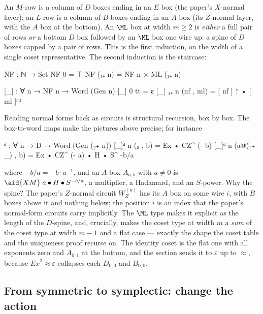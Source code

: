 \medskip\noindent
An $M$-row is a column of $D$ boxes ending in an $E$ box (the paper's
$X$-normal layer); an $L$-row is a column of $B$ boxes ending in an $A$
box (its $Z$-normal layer, with the $A$ box at the bottom).  An
$\ML$ box at width $m \ge 2$ is \emph{either} a full pair of rows
\emph{or} a bottom $D$ box followed by an $\ML$ box one wire up: a
spine of $D$ boxes capped by a pair of rows.  This is the first
induction, on the width of a single coset representative.  The second
induction is the staircase:

\begin{minipage}[c]{0.54\textwidth}
\begingroup\renewcommand{\AgdaCodeStyle}{\footnotesize}
\begin{code}
NF : ℕ → Set
NF 0 = ⊤
NF (₁₊ n) = NF n × ML (₁₊ n)

[_] : ∀ {n} → NF n → Word (Gen n)
[_] {0}     tt         = ε
[_] {₁₊ n}  (nf , ml)  = [ nf ] ↑ • [ ml ]ᵐˡ
\end{code}
\endgroup
\end{minipage}\hfill
\begin{minipage}[c]{0.42\textwidth}\centering
\end{minipage}

\medskip\noindent
Reading normal forms back as circuits is structural recursion, box by
box.  The box-to-word maps make the pictures above
precise; for instance
\begin{code}
[_]ᵈ : ∀ {n} → D → Word (Gen (₂₊ n))
[_]ᵈ {n} (₀ , b) = Ex • CZ^ (- b)
[_]ᵈ {n} (a@(₁₊ _) , b) = Ex • CZ^ (- a) • H • S^ -b/a
\end{code}
where $-b/a = -b \cdot a^{-1}$, and an $A$ box $A_{a,b}$ with $a \ne 0$
is $\aid{XM}\;a \bullet H \bullet S^{-b/a}$, a multiplier, a Hadamard,
and an $S$-power.  Why the spine?  The paper's $Z$-normal circuit
$W_Z^{(n)}$ has its $A$ box on some wire $i$, with $B$ boxes above it
and nothing below; the position $i$ is an index that the paper's
normal-form circuits carry implicitly.  The $\ML$ type makes it explicit
as the length of the $D$-spine, and, crucially, makes the coset type at
width $m$ a \emph{sum} of the coset type at width $m-1$ and a flat case
--- exactly the shape the coset table and the uniqueness proof recurse
on.  The identity coset is the flat one with all exponents zero and
$A_{0,1}$ at the bottom, and the section sends it to $\varepsilon$ up to
$\approx$, because $\mathit{Ex}^2 \approx \varepsilon$ collapses each
$D_{0,0}$ and $B_{0,0}$.

\subsection{From symmetric to symplectic: change the action}\label{sec:pushing}

